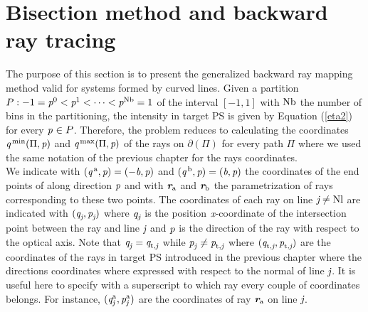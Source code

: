 \section{Bisection method and backward ray tracing}\label{sec:raymapping_explanation}
The purpose of this section is to present the generalized backward ray mapping method valid for systems formed by curved lines. 
Given a partition $P: -1 = \textit{p}^0<\textit{p}^1<\cdots<\textit{p}^{\textrm{Nb}}=1$ of the interval $[-1,1]$ with $\textrm{Nb}$ the number of bins in the partitioning, the intensity in target PS is given by Equation (\ref{eta2}) for every $\textit{p}_{\textrm{} \textit{}}\in P$.
Therefore, the problem reduces to calculating the coordinates 
$\textit{q}^{\textrm{\,min}}(\Pi, \textit{p})$ and $\textit{q}^{\textrm{\,max}}(\Pi, \textit{p})$ of the rays on $\partial$$(\Pi)$ for every path $\Pi$ where we used the same notation of the previous chapter for the rays coordinates.
\\ \indent 
We indicate with $(\textit{q}^{\,\textrm{a}}, \textit{p})= (-\textit{b}, \textit{p})$ and $(\textit{q}^{\,\textrm{b}}, \textit{p}) = (\textit{b}, \textit{p})$ the coordinates of the end points of  along direction $\textit{p}$ and with $\textit{\textbf{r}}_{\textrm{a}}$ and $\textit{\textbf{r}}_{\textrm{b}}$ the parametrization of rays corresponding to these two points.
The coordinates of each ray on line $\textit{j}\neq \textrm{Nl}$ are indicated with $(\textit{q}_{\textit{j}}, \textit{p}_{\textit{j}})$ where $\textit{q}_{\textit{j}}$ is the position $\textit{x}$-coordinate of the intersection point between the ray and line $\textit{j}$ and $\textit{p}$ is the direction of the ray with respect to the optical axis. Note that $\textit{q}_{\textrm{\textit{j}} \textit{}}=\textit{q}_{\textrm{t,} \textit{\textit{j}}}$ while $\textit{p}_{\textrm{\textit{j}} \textit{}}\neq\textit{p}_{\textrm{t,} \textit{\textit{j}}}$ where $(\textit{q}_{\textrm{t,} \textit{\textit{j}}},\textit{p}_{\textrm{t,} \textit{\textit{j}}})$ are the coordinates of the rays in target PS  introduced in the previous chapter where the directions coordinates where expressed with respect to the normal of line $\textit{j}$. It is useful here to specify with a superscript to which ray every couple of coordinates belongs. For instance, $(\textit{q}_{\textrm{\textit{j}} \textit{}}^{\textrm{a}}, \textit{p}_{\textrm{\textit{j}} \textit{}}^{\textrm{a}})$ are the coordinates of ray $\textit{\textbf{r}}_{\textrm{a}}$ on line $\textit{j}$.\\ \indent 
